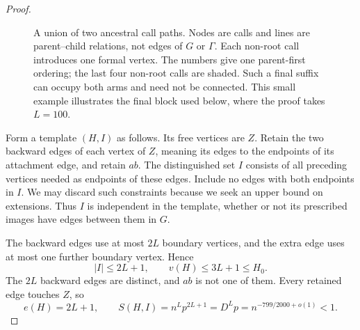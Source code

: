 \begin{proof}
\begin{figure}[htbp]
\centering
{}
\caption{A union of two ancestral call paths. Nodes are calls and lines
are parent--child relations, not edges of $G$ or $\Gamma$.
Each non-root call introduces one formal vertex.
The numbers give one parent-first ordering; the last four non-root calls
are shaded. Such a final suffix can occupy both arms and need not be
connected. This small example illustrates the final block used below,
where the proof takes $L=100$.}
\label{fig:call-paths}
\end{figure}

Form a template $(H,I)$ as follows. Its free vertices are $Z$. Retain the
two backward edges of each vertex of $Z$, meaning its edges to the
endpoints of its attachment edge, and retain $ab$. The distinguished set
$I$ consists of all preceding vertices needed as endpoints of these
edges. Include no edges with both endpoints in $I$. We may discard such
constraints because we seek an upper bound on extensions. Thus $I$ is
independent in the template, whether or not its prescribed images have
edges between them in $G$.

The backward edges use at most $2L$ boundary vertices, and the extra edge
uses at most one further boundary vertex. Hence
\[
 |I|\leq2L+1,\qquad v(H)\leq3L+1\leq H_0.
\]
The $2L$ backward edges are distinct, and $ab$ is not one of them.
Every retained edge touches $Z$, so
\begin{equation}\label{eq:terminal-scaling}
 e(H)=2L+1,\qquad
 S(H,I)=n^Lp^{2L+1}=D^Lp
       =n^{-799/2000+o(1)}<1.
\end{equation}


\end{proof}
